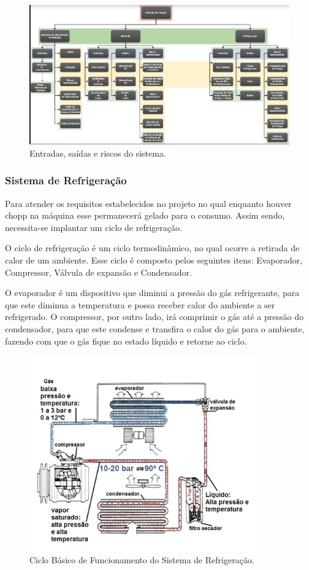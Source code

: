 		\begin{figure}[H]
			\centering
			\includegraphics[scale= 0.55]{figuras/entradas-saidas.png}
			\caption{Entradas, saídas e riscos do sistema.}
			\label{entradas-saidas}
		\end{figure}	

		\subsubsection[Sistema de Refrigeração]{Sistema de Refrigeração}
			Para atender os requisitos estabelecidos no projeto no qual enquanto houver chopp na máquina esse permanecerá gelado para o consumo. Assim sendo, necessita-se implantar um ciclo de refrigeração. 
			
			O ciclo de refrigeração é um ciclo termodinâmico, no qual ocorre a retirada de calor de um ambiente. Esse ciclo é composto pelos seguintes itens: Evaporador, Compressor, Válvula de expansão e Condensador.
			
			O evaporador é um dispositivo que diminui a pressão do gás refrigerante, para que este diminua a temperatura e possa receber calor do ambiente a ser refrigerado. O compressor, por outro lado, irá comprimir o gás até a pressão do condensador, para que este condense e transfira o calor do gás para o ambiente, fazendo com que o gás fique no estado líquido e  retorne ao ciclo.

			\begin{figure}[H]
				\centering
				\includegraphics[scale= 0.7]{figuras/sistema-refrigerador.png}
				\caption{Ciclo Básico de Funcionamento do Sistema de Refrigeração.}
				\label{sistema-refrigerador}
			\end{figure}				

